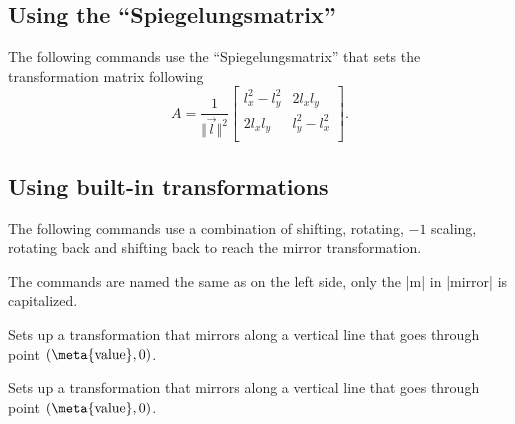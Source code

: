 \begin{paracol}{2}

\subsection{Using the ``Spiegelungsmatrix''}

The following commands use the ``Spiegelungsmatrix'' that sets the transformation matrix following
\begin{equation*}
  A = \frac{1}{\Vert\vec l\Vert^2} \begin{bmatrix}
  l_x^2-l_y^2 & 2l_xl_y \\
  2l_xl_y & l_y^2-l_x^2\\
  \end{bmatrix}.
\end{equation*}

\switchcolumn%

\subsection{Using built-in transformations}

The following commands use a combination of shifting, rotating, $-1$ scaling,
rotating back and shifting back to reach the mirror transformation.

The commands are named the same as on the left side,
only the |m| in |mirror| is capitalized.

\switchcolumn*%

\begin{command}{\pgftransformxmirror{}}
  Sets up a transformation that mirrors along a vertical line that goes through point $(\text{\meta{value}}, 0)$.

\begin{codeexample}[preamble=\usepgflibrary{transformations.mirror}]
\end{codeexample}
\end{command}

\switchcolumn%

\begin{command}{\pgftransformxMirror{}}
  Sets up a transformation that mirrors along a vertical line that goes through point $(\text{\meta{value}}, 0)$.


\end{command}
\end{paracol}

